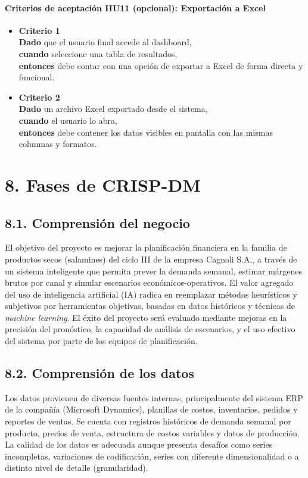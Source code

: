 \documentclass[
11pt, %
]{charter}
\begin{document}
\vspace{1em}

\paragraph{Criterios de aceptación HU11 (opcional): Exportación a Excel}
\begin{itemize}
  \item \textbf{Criterio 1} \\
  \textbf{Dado} que el usuario final accede al dashboard, \\
  \textbf{cuando} seleccione una tabla de resultados, \\
  \textbf{entonces} debe contar con una opción de exportar a Excel de forma directa y funcional.

  \item \textbf{Criterio 2} \\
  \textbf{Dado} un archivo Excel exportado desde el sistema, \\
  \textbf{cuando} el usuario lo abra, \\
  \textbf{entonces} debe contener los datos visibles en pantalla con las mismas columnas y formatos.
\end{itemize}

\section{8. Fases de CRISP-DM}

\subsection*{8.1. Comprensión del negocio}
El objetivo del proyecto es mejorar la planificación financiera en la familia de productos secos (salamines) del ciclo III de la empresa Cagnoli S.A., a través de un sistema inteligente que permita prever la demanda semanal, estimar márgenes brutos por canal y simular escenarios económicos-operativos. El valor agregado del uso de inteligencia artificial (IA) radica en reemplazar métodos heurísticos y subjetivos por herramientas objetivas, basadas en datos históricos y técnicas de \textit{machine learning}. 
El éxito del proyecto será evaluado mediante mejoras en la precisión del pronóstico, la capacidad de análisis de escenarios, y el uso efectivo del sistema por parte de los equipos de planificación.

\subsection*{8.2. Comprensión de los datos}
Los datos provienen de diversas fuentes internas, principalmente del sistema ERP de la compañía (Microsoft Dynamics), planillas de costos, inventarios, pedidos y reportes de ventas. Se cuenta con registros históricos de demanda semanal por producto, precios de venta, estructura de costos variables y datos de producción. La calidad de los datos es adecuada aunque presenta desafíos como series incompletas, variaciones de codificación, series con diferente dimensionalidad o a distinto nivel de detalle (granularidad).
\end{document}
